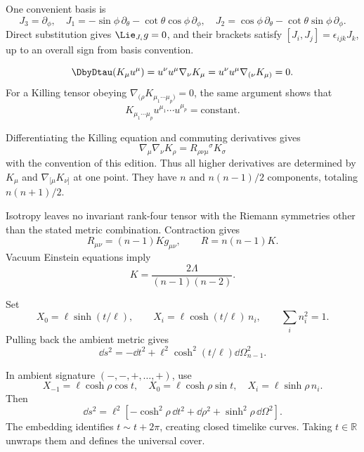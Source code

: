 \begin{solutions}

\begin{solution}
One convenient basis is
\[
J_3=\partial_\phi,\quad
J_1=-\sin\phi\,\partial_\theta-\cot\theta\cos\phi\,\partial_\phi,\quad
J_2=\cos\phi\,\partial_\theta-\cot\theta\sin\phi\,\partial_\phi.
\]
Direct substitution gives \(\Lie_{J_i}g=0\), and their brackets satisfy
\([J_i,J_j]=\epsilon_{ijk}J_k\), up to an overall sign from basis convention.
\end{solution}

\begin{solution}
\[
\DbyDtau(K_\mu u^\mu)
=u^\nu u^\mu\nabla_\nu K_\mu
=u^\nu u^\mu\nabla_{(\nu}K_{\mu)}=0.
\]
For a Killing tensor obeying
\(\nabla_{(\rho}K_{\mu_1\cdots\mu_p)}=0\), the same argument shows that
\[
K_{\mu_1\cdots\mu_p}u^{\mu_1}\cdots u^{\mu_p}
=\text{constant}.
\]
\end{solution}

\begin{solution}
Differentiating the Killing equation and commuting derivatives gives
\[
\nabla_\mu\nabla_\nu K_\rho
=R_{\rho\nu\mu}{}^\sigma K_\sigma
\]
with the convention of this edition.  Thus all higher derivatives are
determined by \(K_\mu\) and \(\nabla_{[\mu}K_{\nu]}\) at one point.  They have
\(n\) and \(n(n-1)/2\) components, totaling \(n(n+1)/2\).
\end{solution}

\begin{solution}
Isotropy leaves no invariant rank-four tensor with the Riemann symmetries
other than the stated metric combination.  Contraction gives
\[
R_{\mu\nu}=(n-1)Kg_{\mu\nu},\qquad
R=n(n-1)K.
\]
Vacuum Einstein equations imply
\[
K=\frac{2\Lambda}{(n-1)(n-2)}.
\]
\end{solution}

\begin{solution}
Set
\[
X_0=\ell\sinh(t/\ell),\qquad
X_i=\ell\cosh(t/\ell)\,n_i,\qquad \sum_i n_i^2=1.
\]
Pulling back the ambient metric gives
\[
\dd s^2=-\dd t^2+\ell^2\cosh^2(t/\ell)\dd\Omega_{n-1}^2.
\]
\end{solution}

\begin{solution}
In ambient signature \((-,-,+,\ldots,+)\), use
\[
X_{-1}=\ell\cosh\rho\cos t,\quad
X_0=\ell\cosh\rho\sin t,\quad
X_i=\ell\sinh\rho\,n_i.
\]
Then
\[
\dd s^2=\ell^2[-\cosh^2\rho\,\dd t^2+\dd\rho^2
+\sinh^2\rho\,\dd\Omega^2].
\]
The embedding identifies \(t\sim t+2\pi\), creating closed timelike curves.
Taking \(t\in\mathbb R\) unwraps them and defines the universal cover.
\end{solution}


\end{solutions}
